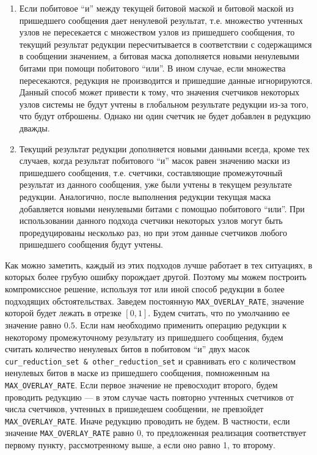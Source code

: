 \documentclass{article}
\theoremstyle{plain}
\theoremstyle{plain}
\theoremstyle{plain}
\theoremstyle{plain}
\theoremstyle{definition}
\theoremstyle{remark}
\theoremstyle{plain}
\begin{document}
\begin{enumerate}
    \item Если побитовое \enquote{и} между текущей битовой маской и битовой маской из пришедшего сообщения дает ненулевой результат, т.е. множество учтенных узлов не пересекается с множеством узлов из пришедшего сообщения, то текущий результат редукции пересчитывается в соответствии с содержащимся в сообщении значением, а битовая маска дополняется новыми ненулевыми битами при помощи побитового \enquote{или}. В ином случае, если множества пересекаются, редукция не производится и пришедшие данные игнорируются. Данный способ может привести к тому, что значения счетчиков некоторых узлов системы не будут учтены в глобальном результате редукции из-за того, что будут отброшены. Однако ни один счетчик не будет добавлен в редукцию дважды.
    
    \item Текущий результат редукции дополняется новыми данными всегда, кроме тех случаев, когда результат побитового \enquote{и} масок равен значению маски из пришедшего сообщения, т.е. счетчики, составляющие промежуточный результат из данного сообщения, уже были учтены в текущем результате редукции. Аналогично, после выполнения редукции текущая маска добавляется новыми ненулевыми битами с помощью побитового \enquote{или}. При использовании данного подхода счетчики некоторых узлов могут быть проредуцированы несколько раз, но при этом данные счетчиков любого пришедшего сообщения будут учтены.
\end{enumerate}

Как можно заметить, каждый из этих подходов лучше работает в тех ситуациях, в которых более грубую ошибку порождает другой. Поэтому мы можем построить компромиссное решение, используя тот или иной способ редукции в более подходящих обстоятельствах. Заведем постоянную \texttt{MAX\_OVERLAY\_RATE}, значение которой будет лежать в отрезке $[0, 1]$. Будем считать, что по умолчанию ее значение равно $0.5$. Если нам необходимо применить операцию редукции к некоторому промежуточному результату из пришедшего сообщения, будем считать количество ненулевых битов в побитовом \enquote{и} двух масок \texttt{cur\_reduction\_set \& other\_reduction\_set} и сравнивать его с количеством ненулевых битов в маске из пришедшего сообщения, помноженным на \texttt{MAX\_OVERLAY\_RATE}. Если первое значение не превосходит второго, будем проводить редукцию --- в этом случае часть повторно учтенных счетчиков от числа счетчиков, учтенных в пришедешем сообщении, не превзойдет \texttt{MAX\_OVERLAY\_RATE}. Иначе редукцию проводить не будем. В частности, если значение \texttt{MAX\_OVERLAY\_RATE} равно 0, то предложенная реализация соответствует первому пункту, рассмотренному выше, а если оно равно 1, то второму.
\end{document}

